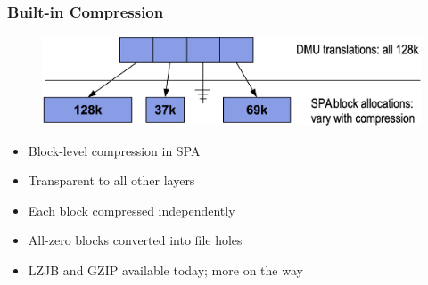 % 
% 
% 
\begin{frame}[fragile]
    \frametitle{Built-in Compression}
    \begin{figure}
    \includegraphics[width=0.8\linewidth]{figs/ZFS-compression.png}
    \end{figure}
    \begin{itemize}
        \item Block-level compression in SPA
        \item Transparent to all other layers
        \item Each block compressed independently
        \item All-zero blocks converted into file holes
        \item LZJB and GZIP available today; more on the way
    \end{itemize}
\end{frame}
% 
% 
% 

